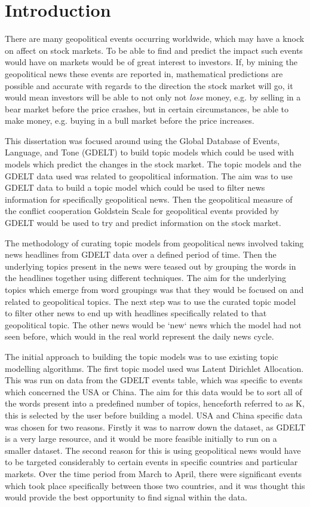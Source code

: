 \section{Introduction}
There are many geopolitical events occurring worldwide, which may have a knock on affect on stock markets. To be able to find and predict the impact such events would have on markets would be of great interest to investors. If, by mining the geopolitical news these events are reported in, mathematical predictions are possible and accurate with regards to the direction the stock market will go, it would mean investors will be able to not only not \textit{lose} money, e.g. by selling in a bear market before the price crashes, but in certain circumstances, be able to make money, e.g. buying in a bull market before the price increases.

This dissertation was focused around using the Global Database of Events, Language, and Tone (GDELT) to build topic models which could be used with models which predict the changes in the stock market. The topic models and the GDELT data used was related to geopolitical information. The aim was to use GDELT data to build a topic model which could be used to filter news information for specifically geopolitical news. Then the geopolitical measure of the conflict cooperation Goldstein Scale for geopolitical events provided by GDELT would be used to try and predict information on the stock market.

The methodology of curating topic models from geopolitical news involved taking news headlines from GDELT data over a defined period of time. Then the underlying topics present in the news were teased out by grouping the words in the headlines together using different techniques. The aim for the underlying topics which emerge from word groupings was that they would be focused on and related to geopolitical topics. The next step was to use the curated topic model to filter other news to end up with headlines specifically related to that geopolitical topic. The other news would be `new` news which the model had not seen before, which would in the real world represent the daily news cycle.

The initial approach to building the topic models was to use existing topic modelling algorithms. The first topic model used was Latent Dirichlet Allocation. This was run on data from the GDELT events table, which was specific to events which concerned the USA or China. The aim for this data would be to sort all of the words present into a predefined number of topics, henceforth referred to as K, this is selected by the user before building a model. USA and China specific data was chosen for two reasons. Firstly it was to narrow down the dataset, as GDELT is a very large resource, and it would be more feasible initially to run on a smaller dataset. The second reason for this is using geopolitical news would have to be targeted considerably to certain events in specific countries and particular markets. Over the time period from March to April, there were significant events which took place specifically between those two countries, and it was thought this would provide the best opportunity to find signal within the data. 

